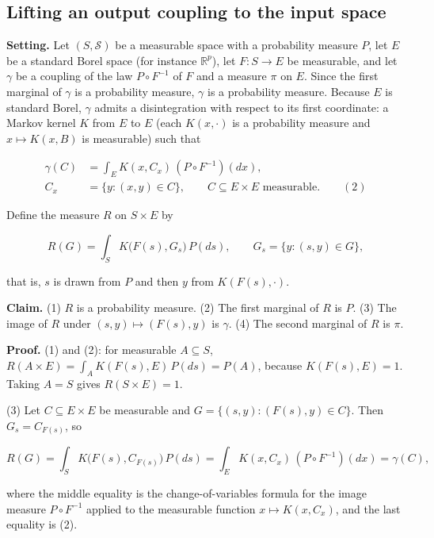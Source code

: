 \documentclass[11pt,a4paper]{report}
\begin{document}
\subsection{\texorpdfstring{Lifting an output coupling to the input space}{Lifting an output coupling to the input space}}
\label{report-step-AverageLMC-SquaredTransport-lean-2}


\textbf{Setting.} Let \((S,\mathcal S)\) be a measurable space with a probability measure \(P\), let \(E\) be a standard Borel space (for instance \(\mathbb R^p\)), let \(F:S\to E\) be measurable, and let \(\gamma\) be a coupling of the law \(P\circ F^{-1}\) of \(F\) and a measure \(\pi\) on \(E\). Since the first marginal of \(\gamma\) is a probability measure, \(\gamma\) is a probability measure. Because \(E\) is standard Borel, \(\gamma\) admits a disintegration with respect to its first coordinate: a Markov kernel \(K\) from \(E\) to \(E\) (each \(K(x,\cdot)\) is a probability measure and \(x\mapsto K(x,B)\) is measurable) such that


\[\begin{aligned}
\gamma(C)&=\int_E K(x,C_x)\,(P\circ F^{-1})(dx),\\
C_x&=\{y:(x,y)\in C\},\qquad C\subseteq E\times E\text{ measurable}.
\qquad(2)
\end{aligned}\]


Define the measure \(R\) on \(S\times E\) by


\[R(G)=\int_S K\bigl(F(s),G_s\bigr)\,P(ds),\qquad G_s=\{y:(s,y)\in G\},\]


that is, \(s\) is drawn from \(P\) and then \(y\) from \(K(F(s),\cdot)\).




\textbf{Claim.} (1) \(R\) is a probability measure. (2) The first marginal of \(R\) is \(P\). (3) The image of \(R\) under \((s,y)\mapsto(F(s),y)\) is \(\gamma\). (4) The second marginal of \(R\) is \(\pi\).




\textbf{Proof.} (1) and (2): for measurable \(A\subseteq S\), \(R(A\times E)=\int_AK(F(s),E)\,P(ds)=P(A)\), because \(K(F(s),E)=1\). Taking \(A=S\) gives \(R(S\times E)=1\).




(3) Let \(C\subseteq E\times E\) be measurable and \(G=\{(s,y):(F(s),y)\in C\}\). Then \(G_s=C_{F(s)}\), so


\[R(G)=\int_SK\bigl(F(s),C_{F(s)}\bigr)\,P(ds)=\int_EK(x,C_x)\,(P\circ F^{-1})(dx)=\gamma(C),\]


where the middle equality is the change-of-variables formula for the image measure \(P\circ F^{-1}\) applied to the measurable function \(x\mapsto K(x,C_x)\), and the last equality is (2).
\end{document}
